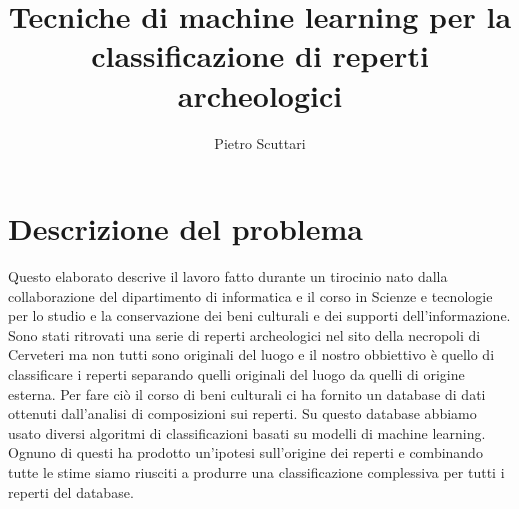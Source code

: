 \documentclass[a4paper,12pt]{report}
\begin{document}
\title{Tecniche di machine learning per la classificazione di reperti archeologici}
\author{Pietro Scuttari}
%
% 
%
\beforepreface
% 
%
\section{Descrizione del problema}
Questo elaborato descrive il lavoro fatto durante un tirocinio nato dalla
collaborazione del dipartimento di informatica e il corso in Scienze e
tecnologie per lo studio e la conservazione dei beni culturali e dei supporti
dell'informazione. Sono stati ritrovati una serie di reperti archeologici nel
sito della necropoli di Cerveteri ma non tutti sono originali del luogo e il
nostro obbiettivo è quello di classificare i reperti separando quelli originali
del luogo da quelli di origine esterna. Per fare ciò il corso di beni culturali
ci ha fornito un database di dati ottenuti dall'analisi di composizioni sui
reperti. Su questo database abbiamo usato diversi algoritmi di classificazioni
basati su modelli di machine learning. Ognuno di questi ha prodotto un'ipotesi
sull'origine dei reperti e combinando tutte le stime siamo riusciti a produrre
una classificazione complessiva per tutti i reperti del database.

\end{document}
